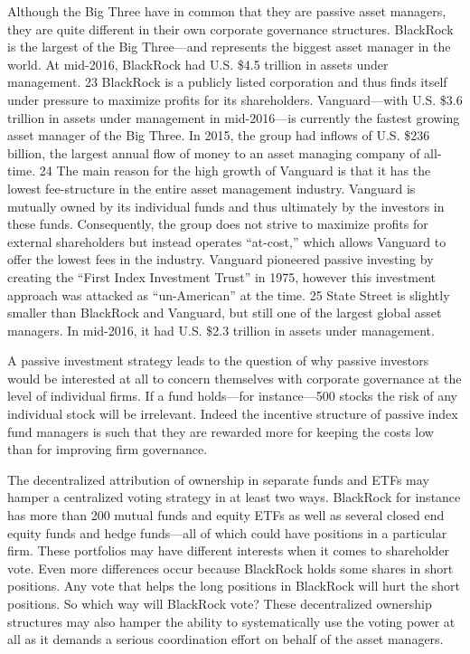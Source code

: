 \documentclass[
]{book}
\begin{document}
Although the Big Three have in common that they are passive asset managers, they are quite different in their own corporate governance structures. BlackRock is the largest of the Big Three---and represents the biggest asset manager in the world. At mid-2016, BlackRock had U.S. \$4.5 trillion in assets under management. 23 BlackRock is a publicly listed corporation and thus finds itself under pressure to maximize profits for its shareholders. Vanguard---with U.S. \$3.6 trillion in assets under management in mid-2016---is currently the fastest growing asset manager of the Big Three. In 2015, the group had inflows of U.S. \$236 billion, the largest annual flow of money to an asset managing company of all-time. 24 The main reason for the high growth of Vanguard is that it has the lowest fee-structure in the entire asset management industry. Vanguard is mutually owned by its individual funds and thus ultimately by the investors in these funds. Consequently, the group does not strive to maximize profits for external shareholders but instead operates ``at-cost,'' which allows Vanguard to offer the lowest fees in the industry. Vanguard pioneered passive investing by creating the ``First Index Investment Trust'' in 1975, however this investment approach was attacked as ``un-American'' at the time. 25 State Street is slightly smaller than BlackRock and Vanguard, but still one of the largest global asset managers. In mid-2016, it had U.S. \$2.3 trillion in assets under management.

A passive investment strategy leads to the question of why passive investors would be interested at all to concern themselves with corporate governance at the level of individual firms. If a fund holds---for instance---500 stocks the risk of any individual stock will be irrelevant. Indeed the incentive structure of passive index fund managers is such that they are rewarded more for keeping the costs low than for improving firm governance.

The decentralized attribution of ownership in separate funds and ETFs may hamper a centralized voting strategy in at least two ways. BlackRock for instance has more than 200 mutual funds and equity ETFs as well as several closed end equity funds and hedge funds---all of which could have positions in a particular firm. These portfolios may have different interests when it comes to shareholder vote. Even more differences occur because BlackRock holds some shares in short positions. Any vote that helps the long positions in BlackRock will hurt the short positions. So which way will BlackRock vote? These decentralized ownership structures may also hamper the ability to systematically use the voting power at all as it demands a serious coordination effort on behalf of the asset managers.
\end{document}
